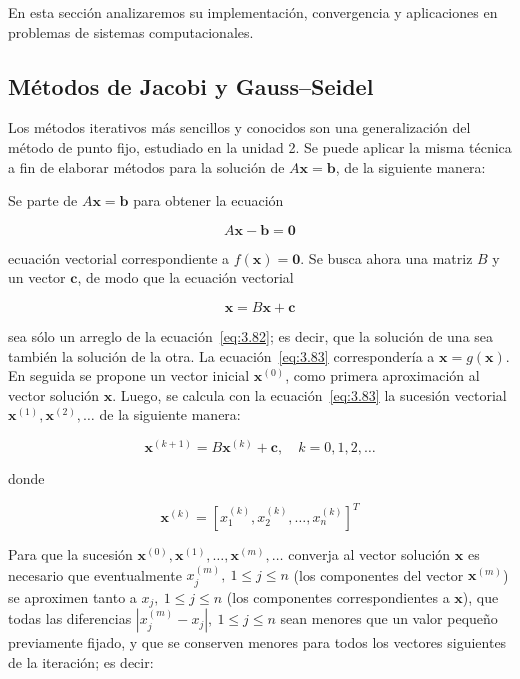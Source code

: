 \documentclass[12pt,letterpaper]{article}
\theoremstyle{definition}
\theoremstyle{plain}
\theoremstyle{remark}
\begin{document}
En esta sección analizaremos su implementación, convergencia y aplicaciones en problemas de sistemas computacionales.

\subsection{Métodos de Jacobi y Gauss–Seidel}

Los métodos iterativos más sencillos y conocidos son una generalización del método de punto fijo, estudiado en la unidad 2. Se puede aplicar la misma técnica a fin de elaborar métodos para la solución de $A \mathbf{x} = \mathbf{b}$, de la siguiente manera:

Se parte de $A \mathbf{x} = \mathbf{b}$ para obtener la ecuación

\begin{equation}
A \mathbf{x} - \mathbf{b} = \mathbf{0}
\label{eq:3.82}
\tag{1}
\end{equation}

ecuación vectorial correspondiente a $f(\mathbf{x}) = \mathbf{0}$. Se busca ahora una matriz $B$ y un vector $\mathbf{c}$, de modo que la ecuación vectorial

\begin{equation}
\mathbf{x} = B \mathbf{x} + \mathbf{c}
\label{eq:3.83}
\tag{2}
\end{equation}

sea sólo un arreglo de la ecuación~\eqref{eq:3.82}; es decir, que la solución de una sea también la solución de la otra. La ecuación~\eqref{eq:3.83} correspondería a $\mathbf{x} = g(\mathbf{x})$. En seguida se propone un vector inicial $\mathbf{x}^{(0)}$, como primera aproximación al vector solución $\mathbf{x}$. Luego, se calcula con la ecuación~\eqref{eq:3.83} la sucesión vectorial $\mathbf{x}^{(1)}, \mathbf{x}^{(2)}, \ldots$ de la siguiente manera:

\begin{equation}
\mathbf{x}^{(k+1)} = B \mathbf{x}^{(k)} + \mathbf{c}, \quad k = 0, 1, 2, \ldots
\label{eq:iter} \tag{3}
\end{equation}

donde

\begin{equation}
\mathbf{x}^{(k)} = [x_1^{(k)}, x_2^{(k)}, \ldots, x_n^{(k)}]^T
\label{eq:3.84}
\tag{4}
\end{equation}

Para que la sucesión $\mathbf{x}^{(0)}, \mathbf{x}^{(1)}, \ldots, \mathbf{x}^{(m)}, \ldots$ converja al vector solución $\mathbf{x}$ es necesario que eventualmente $x_j^{(m)},\ 1 \leq j \leq n$ (los componentes del vector $\mathbf{x}^{(m)}$) se aproximen tanto a $x_j,\ 1 \leq j \leq n$ (los componentes correspondientes a $\mathbf{x}$), que todas las diferencias $|x_j^{(m)} - x_j|,\ 1 \leq j \leq n$ sean menores que un valor pequeño previamente fijado, y que se conserven menores para todos los vectores siguientes de la iteración; es decir:
\end{document}
